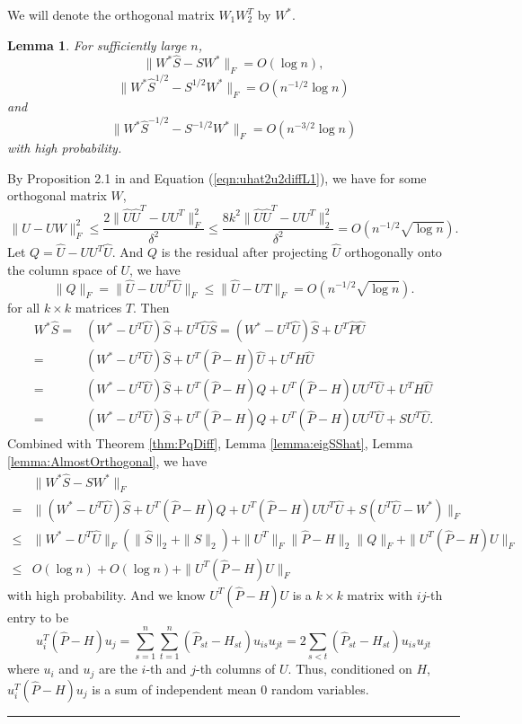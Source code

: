 \documentclass[a4paper]{article}
\newenvironment{proof}{{\bf Proof:  }}{\hfill\rule{2mm}{2mm}}
\newtheorem{lemma}[fact]{Lemma}
\begin{document}
We will denote the orthogonal matrix $W_1 W_2^T$ by $W^*$.
\begin{lemma}
\label{lemma:exchange}
For sufficiently large $n$,
\[
	\| W^* \hat{S} - S W^* \|_F = O(\log n),
\]
\[
	\|W^* \hat{S}^{1/2} - S^{1/2} W^* \|_F = O(n^{-1/2} \log n)
\]
and
\[
	\| W^* \hat{S}^{-1/2} - S^{-1/2} W^* \|_F = O(n^{-3/2} \log n)
\]
with high probability.
\end{lemma}
\begin{proof}

By Proposition 2.1 in \cite{rohe2011spectral} and Equation (\ref{eqn:uhat2u2diffL1}), we have for some orthogonal matrix $W$,
\[
\|\hat{U} - U W\|_F^2 \le \frac{2 \|\hat{U} \hat{U}^T - U U^T\|_F^2}{\delta^2}
\le \frac{8 k^2 \|\hat{U} \hat{U}^T - U U^T\|_2^2}{\delta^2} = O(n^{-1/2} \sqrt{\log n}).
\]
Let $Q = \hat{U} - U U^T \hat{U}$. And $Q$ is the residual after projecting $\hat{U}$ orthogonally onto the column space of $U$, we have
\begin{equation}
\label{eqn:QFnorm}
\| Q \|_F = \| \hat{U} - U U^T \hat{U} \|_F \le \| \hat{U} - U T \|_F = O(n^{-1/2} \sqrt{\log n}).
\end{equation}
for all $k \times k$ matrices $T$. 
Then
\begin{align*}
	W^* \hat{S} = & (W^* - U^T \hat{U}) \hat{S} + U^T \hat{U} \hat{S}
    = (W^* - U^T \hat{U}) \hat{S} + U^T \hat{P} \hat{U} \\
    = & (W^* - U^T \hat{U}) \hat{S} + U^T (\hat{P} - H) \hat{U} + U^T H \hat{U} \\
    = & (W^* - U^T \hat{U}) \hat{S} + U^T (\hat{P} - H) Q + U^T (\hat{P} - H) U U^T \hat{U} + U^T H \hat{U} \\
    = & (W^* - U^T \hat{U}) \hat{S} + U^T (\hat{P} - H) Q + U^T (\hat{P} - H) U U^T \hat{U} + S U^T \hat{U}.
\end{align*}
Combined with Theorem \ref{thm:PqDiff}, Lemma \ref{lemma:eigSShat}, Lemma \ref{lemma:AlmostOrthogonal}, we have
\begin{align*}
	& \| W^* \hat{S} - S W^* \|_F \\
    = & \| (W^* - U^T \hat{U}) \hat{S} + U^T (\hat{P} - H) Q + U^T (\hat{P} - H) U U^T \hat{U} + S (U^T \hat{U} - W^*)\|_F \\
    \le & \| W^* - U^T \hat{U} \|_F (\| \hat{S} \|_2 + \| S \|_2) + \| U^T \|_F \| \hat{P} - H\|_2 \| Q \|_F + \| U^T (\hat{P} - H) U \|_F \\
    \le & O(\log n) + O(\log n) + \| U^T (\hat{P} - H) U \|_F
\end{align*}
with high probability. And we know $U^T (\hat{P} - H) U$ is a $k \times k$ matrix with $ij$-th entry to be
\[
	u_i^T (\hat{P} - H) u_j
    = \sum_{s=1}^n \sum_{t=1}^n (\hat{P}_{st} - H_{st}) u_{is} u_{jt}
    = 2 \sum_{s<t} (\hat{P}_{st} - H_{st}) u_{is} u_{jt}
\]
where $u_i$ and $u_j$ are the $i$-th and $j$-th columns of $U$. Thus, conditioned on $H$, $u_i^T (\hat{P} - H) u_j$ is a sum of independent mean 0 random variables.



\end{proof}
\end{document}
